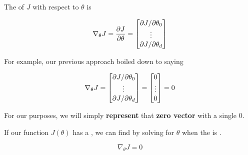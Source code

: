         \begin{kequation}
            The  of $J$ with respect to $\theta$ is
            
            \begin{equation*}
                \nabla_\theta J =
                \frac{\partial J}{\partial \theta} =
                \begin{bmatrix}
                    {\partial J}/{\partial \theta_0} \\
                    \vdots \\
                    {\partial J}/{\partial \theta_d}
                \end{bmatrix}
            \end{equation*}
        
        \end{kequation}
        
        
        For example, our previous approach boiled down to saying
        
        \begin{equation}
            \nabla_\theta J =
            \begin{bmatrix}
                {\partial J}/{\partial \theta_0} \\
                \vdots \\
                {\partial J}/{\partial \theta_d}
            \end{bmatrix}
            = 
            \begin{bmatrix}
                0 \\
                \vdots \\
                0
            \end{bmatrix}
            =
            0
        \end{equation}
        
        For our purposes, we will simply \textbf{represent} that \textbf{zero vector} with a single 0.\\
        
        \begin{concept}
            
            If our function $J(\theta)$ has a , we can  find  by solving for $\theta$ when the  is .
            
            \begin{equation*}
                \nabla_\theta J=0
            \end{equation*}

        \end{concept}
        
